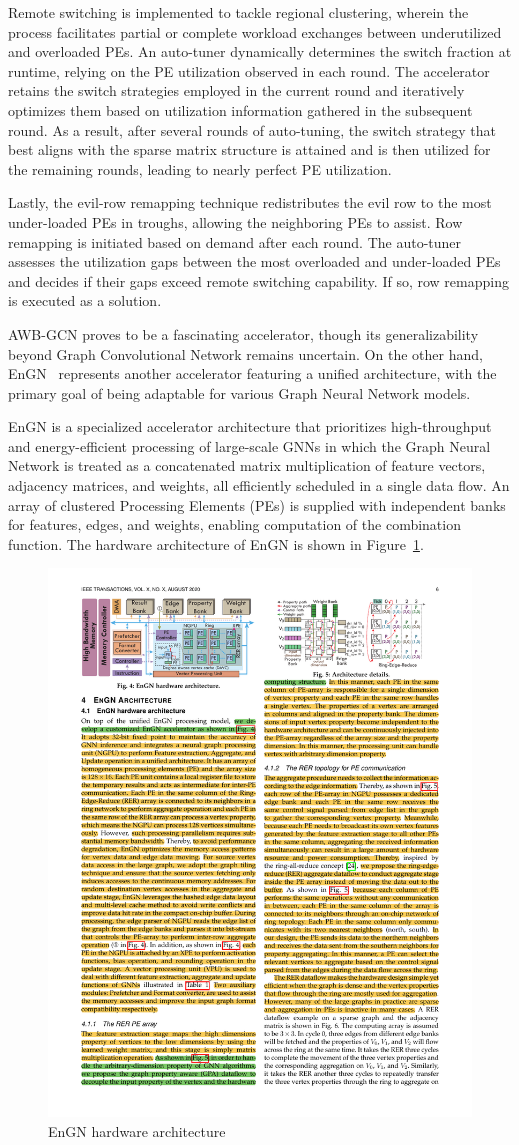 Remote switching is implemented to tackle regional clustering, wherein the process facilitates partial or complete workload exchanges between underutilized and overloaded PEs.
An auto-tuner dynamically determines the switch fraction at runtime, relying on the PE utilization observed in each round.
The accelerator retains the switch strategies employed in the current round and iteratively optimizes them based on utilization information gathered in the subsequent round.
As a result, after several rounds of auto-tuning, the switch strategy that best aligns with the sparse matrix structure is attained and is then utilized for the remaining rounds, leading to nearly perfect PE utilization.

Lastly, the evil-row remapping technique redistributes the evil row to the most under-loaded PEs in troughs, allowing the neighboring PEs to assist.
Row remapping is initiated based on demand after each round.
The auto-tuner assesses the utilization gaps between the most overloaded and under-loaded PEs and decides if their gaps exceed remote switching capability.
If so, row remapping is executed as a solution.

AWB-GCN proves to be a fascinating accelerator, though its generalizability beyond Graph Convolutional Network remains uncertain.
On the other hand, EnGN~\cite{DBLP:journals/corr/abs-1909-00155} represents another accelerator featuring a unified architecture, with the primary goal of being adaptable for various Graph Neural Network models.

EnGN is a specialized accelerator architecture that prioritizes high-throughput and energy-efficient processing of large-scale GNNs in which the Graph Neural Network is treated as a concatenated matrix multiplication of feature vectors, adjacency matrices, and weights, all efficiently scheduled in a single data flow.
An array of clustered Processing Elements (PEs) is supplied with independent banks for features, edges, and weights, enabling computation of the combination function.
The hardware architecture of EnGN is shown in Figure~\ref{fig:engn_architecture}.

\begin{figure}[t]
    \centering
    \includegraphics[height=0.3\textwidth]{Images/EnGN_architecture}
    \caption{EnGN hardware architecture~\cite{DBLP:journals/corr/abs-1909-00155}}
    \label{fig:engn_architecture}
\end{figure}

